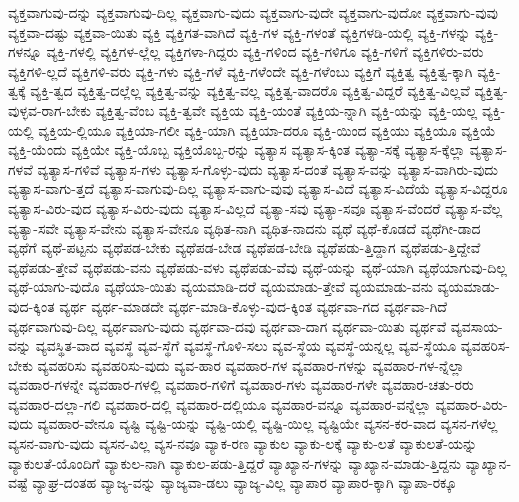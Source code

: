 {ವ್ಯಕ್ತವಾಗುವು-ದನ್ನು
ವ್ಯಕ್ತವಾಗುವು-ದಿಲ್ಲ
ವ್ಯಕ್ತವಾಗು-ವುದು
ವ್ಯಕ್ತವಾಗು-ವುದೇ
ವ್ಯಕ್ತವಾಗು-ವುದೋ
ವ್ಯಕ್ತವಾಗು-ವುವು
ವ್ಯಕ್ತವಾ-ದಷ್ಟು
ವ್ಯಕ್ತವಾ-ಯಿತು
ವ್ಯಕ್ತಿ
ವ್ಯಕ್ತಿಗತ-ವಾಗಿದೆ
ವ್ಯಕ್ತಿ-ಗಳ
ವ್ಯಕ್ತಿ-ಗಳಂತೆ
ವ್ಯಕ್ತಿಗಳಡಿ-ಯಲ್ಲಿ
ವ್ಯಕ್ತಿ-ಗಳನ್ನು
ವ್ಯಕ್ತಿ-ಗಳನ್ನೂ
ವ್ಯಕ್ತಿ-ಗಳಲ್ಲಿ
ವ್ಯಕ್ತಿಗಳ-ಲ್ಲೆಲ್ಲ
ವ್ಯಕ್ತಿಗಳಾ-ಗಿದ್ದರು
ವ್ಯಕ್ತಿ-ಗಳಿಂದ
ವ್ಯಕ್ತಿ-ಗಳಿಗೂ
ವ್ಯಕ್ತಿ-ಗಳಿಗೆ
ವ್ಯಕ್ತಿಗಳಿರು-ವರು
ವ್ಯಕ್ತಿಗಳಿ-ಲ್ಲದೆ
ವ್ಯಕ್ತಿಗಳಿ-ವರು
ವ್ಯಕ್ತಿ-ಗಳು
ವ್ಯಕ್ತಿ-ಗಳೆ
ವ್ಯಕ್ತಿ-ಗಳೆಂದೇ
ವ್ಯಕ್ತಿ-ಗಳೆಂಬು
ವ್ಯಕ್ತಿಗೆ
ವ್ಯಕ್ತಿತ್ವ
ವ್ಯಕ್ತಿತ್ವ-ಕ್ಕಾಗಿ
ವ್ಯಕ್ತಿ-ತ್ವಕ್ಕೆ
ವ್ಯಕ್ತಿ-ತ್ವದ
ವ್ಯಕ್ತಿತ್ವ-ದಲ್ಲೆಲ್ಲ
ವ್ಯಕ್ತಿತ್ವ-ವನ್ನು
ವ್ಯಕ್ತಿತ್ವ-ವಲ್ಲ
ವ್ಯಕ್ತಿತ್ವ-ವಾದರೊ
ವ್ಯಕ್ತಿತ್ವ-ವಿದ್ದರೆ
ವ್ಯಕ್ತಿತ್ವ-ವಿಲ್ಲವೆ
ವ್ಯಕ್ತಿತ್ವ-ವುಳ್ಳವ-ರಾಗ-ಬೇಕು
ವ್ಯಕ್ತಿತ್ವ-ವೆಂಬ
ವ್ಯಕ್ತಿ-ತ್ವವೇ
ವ್ಯಕ್ತಿಯ
ವ್ಯಕ್ತಿ-ಯಂತೆ
ವ್ಯಕ್ತಿಯ-ನ್ನಾಗಿ
ವ್ಯಕ್ತಿ-ಯನ್ನು
ವ್ಯಕ್ತಿ-ಯಲ್ಲ
ವ್ಯಕ್ತಿ-ಯಲ್ಲಿ
ವ್ಯಕ್ತಿಯ-ಲ್ಲಿಯೂ
ವ್ಯಕ್ತಿಯಾ-ಗಲೀ
ವ್ಯಕ್ತಿ-ಯಾಗಿ
ವ್ಯಕ್ತಿಯಾ-ದರೂ
ವ್ಯಕ್ತಿ-ಯಿಂದ
ವ್ಯಕ್ತಿಯು
ವ್ಯಕ್ತಿಯೂ
ವ್ಯಕ್ತಿಯೆ
ವ್ಯಕ್ತಿ-ಯೆಂದು
ವ್ಯಕ್ತಿಯೇ
ವ್ಯಕ್ತಿ-ಯೊಬ್ಬ
ವ್ಯಕ್ತಿಯೊಬ್ಬ-ರನ್ನು
ವ್ಯತ್ಯಾಸ
ವ್ಯತ್ಯಾಸ-ಕ್ಕಿಂತ
ವ್ಯತ್ಯಾ-ಸಕ್ಕೆ
ವ್ಯತ್ಯಾಸ-ಕ್ಕೆಲ್ಲಾ
ವ್ಯತ್ಯಾಸ-ಗಳವೆ
ವ್ಯತ್ಯಾಸ-ಗಳಿವೆ
ವ್ಯತ್ಯಾಸ-ಗಳು
ವ್ಯತ್ಯಾಸ-ಗೊಳ್ಳು-ವುದು
ವ್ಯತ್ಯಾಸ-ದಂತೆ
ವ್ಯತ್ಯಾಸ-ವನ್ನು
ವ್ಯತ್ಯಾಸ-ವಾಗಿರು-ವುದು
ವ್ಯತ್ಯಾಸ-ವಾಗು-ತ್ತದೆ
ವ್ಯತ್ಯಾಸ-ವಾಗುವು-ದಿಲ್ಲ
ವ್ಯತ್ಯಾಸ-ವಾಗು-ವುವು
ವ್ಯತ್ಯಾಸ-ವಿದೆ
ವ್ಯತ್ಯಾಸ-ವಿದೆಯೆ
ವ್ಯತ್ಯಾಸ-ವಿದ್ದರೂ
ವ್ಯತ್ಯಾಸ-ವಿರು-ವುದ
ವ್ಯತ್ಯಾಸ-ವಿರು-ವುದು
ವ್ಯತ್ಯಾಸ-ವಿಲ್ಲದೆ
ವ್ಯತ್ಯಾ-ಸವು
ವ್ಯತ್ಯಾ-ಸವೂ
ವ್ಯತ್ಯಾಸ-ವೆಂದರೆ
ವ್ಯತ್ಯಾಸ-ವೆಲ್ಲ
ವ್ಯತ್ಯಾ-ಸವೇ
ವ್ಯತ್ಯಾಸ-ವೇನು
ವ್ಯತ್ಯಾಸ-ವೇನೂ
ವ್ಯಥಿತ-ನಾಗಿ
ವ್ಯಥಿತ-ನಾದನು
ವ್ಯಥೆ
ವ್ಯಥೆ-ಕೊಡದೆ
ವ್ಯಥೆಗೀ-ಡಾದ
ವ್ಯಥೆಗೆ
ವ್ಯಥೆ-ಪಟ್ಟನು
ವ್ಯಥೆಪಡ-ಬೇಕು
ವ್ಯಥೆಪಡ-ಬೇಡ
ವ್ಯಥೆಪಡ-ಬೇಡಿ
ವ್ಯಥೆಪಡು-ತ್ತಿದ್ದಾಗ
ವ್ಯಥೆಪಡು-ತ್ತಿದ್ದೇವೆ
ವ್ಯಥೆಪಡು-ತ್ತೇವೆ
ವ್ಯಥೆಪಡು-ವನು
ವ್ಯಥೆಪಡು-ವಳು
ವ್ಯಥೆಪಡು-ವೆವು
ವ್ಯಥೆ-ಯನ್ನು
ವ್ಯಥೆ-ಯಾಗಿ
ವ್ಯಥೆಯಾಗುವು-ದಿಲ್ಲ
ವ್ಯಥೆ-ಯಾಗು-ವುದೊ
ವ್ಯಥೆಯಾ-ಯಿತು
ವ್ಯಯಮಾಡಿ-ದರೆ
ವ್ಯಯಮಾಡು-ತ್ತೇವೆ
ವ್ಯಯಮಾಡು-ವನು
ವ್ಯಯಮಾಡು-ವುದ-ಕ್ಕಿಂತ
ವ್ಯರ್ಥ
ವ್ಯರ್ಥ-ಮಾಡದೇ
ವ್ಯರ್ಥ-ಮಾಡಿ-ಕೊಳ್ಳು-ವುದ-ಕ್ಕಿಂತ
ವ್ಯರ್ಥವಾ-ಗದ
ವ್ಯರ್ಥವಾ-ಗಿದೆ
ವ್ಯರ್ಥವಾಗುವು-ದಿಲ್ಲ
ವ್ಯರ್ಥವಾಗು-ವುದು
ವ್ಯರ್ಥವಾ-ದವು
ವ್ಯರ್ಥವಾ-ದಾಗ
ವ್ಯರ್ಥವಾ-ಯಿತು
ವ್ಯರ್ಥವೆ
ವ್ಯವಸಾಯ-ವನ್ನು
ವ್ಯವಸ್ಥಿತ-ವಾದ
ವ್ಯವಸ್ಥೆ
ವ್ಯವ-ಸ್ಥೆಗೆ
ವ್ಯವಸ್ಥೆ-ಗೊಳಿ-ಸಲು
ವ್ಯವ-ಸ್ಥೆಯ
ವ್ಯವಸ್ಥೆ-ಯನ್ನಲ್ಲ
ವ್ಯವ-ಸ್ಥೆಯೂ
ವ್ಯವಹರಿಸ-ಬೇಕು
ವ್ಯವಹರಿಸು
ವ್ಯವಹರಿಸು-ವುದು
ವ್ಯವ-ಹಾರ
ವ್ಯವಹಾರ-ಗಳ
ವ್ಯವಹಾರ-ಗಳನ್ನು
ವ್ಯವಹಾರ-ಗಳ-ನ್ನೆಲ್ಲಾ
ವ್ಯವಹಾರ-ಗಳನ್ನೇ
ವ್ಯವಹಾರ-ಗಳಲ್ಲಿ
ವ್ಯವಹಾರ-ಗಳಿಗೆ
ವ್ಯವಹಾರ-ಗಳು
ವ್ಯವಹಾರ-ಗಳೇ
ವ್ಯವಹಾರ-ಚತು-ರರು
ವ್ಯವಹಾರ-ದಲ್ಲಾ-ಗಲಿ
ವ್ಯವಹಾರ-ದಲ್ಲಿ
ವ್ಯವಹಾರ-ದಲ್ಲಿಯೂ
ವ್ಯವಹಾರ-ವನ್ನೂ
ವ್ಯವಹಾರ-ವನ್ನೆಲ್ಲಾ
ವ್ಯವಹಾರ-ವಿರು-ವುದು
ವ್ಯವಹಾರ-ವೇನೂ
ವ್ಯಷ್ಟಿ
ವ್ಯಷ್ಟಿ-ಯನ್ನು
ವ್ಯಷ್ಟಿ-ಯಲ್ಲಿ
ವ್ಯಷ್ಟಿ-ಯಿಲ್ಲ
ವ್ಯಷ್ಟಿಯೇ
ವ್ಯಸನ-ಕರ-ವಾದ
ವ್ಯಸನ-ಗಳೆಲ್ಲ
ವ್ಯಸನ-ವಾಗು-ವುದು
ವ್ಯಸನ-ವಿಲ್ಲ
ವ್ಯಸ-ನವೂ
ವ್ಯಾಕ-ರಣ
ವ್ಯಾಕುಲ
ವ್ಯಾಕು-ಲಕ್ಕೆ
ವ್ಯಾಕು-ಲತೆ
ವ್ಯಾಕುಲತೆ-ಯನ್ನು
ವ್ಯಾಕುಲತೆ-ಯೊಂದಿಗೆ
ವ್ಯಾಕುಲ-ನಾಗಿ
ವ್ಯಾಕುಲ-ಪಡು-ತ್ತಿದ್ದರೆ
ವ್ಯಾಖ್ಯಾನ-ಗಳನ್ನು
ವ್ಯಾಖ್ಯಾನ-ಮಾಡು-ತ್ತಿದ್ದನು
ವ್ಯಾಖ್ಯಾನ-ವಷ್ಟೆ
ವ್ಯಾಘ್ರ-ದಂತಹ
ವ್ಯಾಜ್ಯ-ವನ್ನು
ವ್ಯಾಜ್ಯವಾ-ಡಲು
ವ್ಯಾಜ್ಯ-ವಿಲ್ಲ
ವ್ಯಾಪಾರ
ವ್ಯಾಪಾರ-ಕ್ಕಾಗಿ
ವ್ಯಾಪಾ-ರಕ್ಕೂ
}
